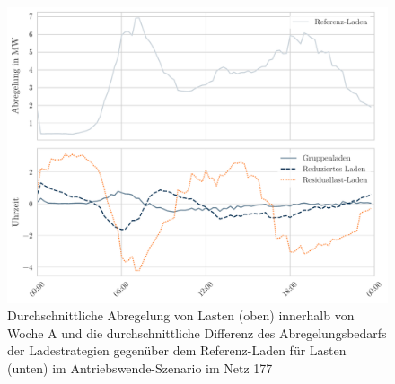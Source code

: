 \begin{figure}[H]
    \centering
    \includegraphics[width=\textwidth]{Bilder/177_load_diff}
    \caption{Durchschnittliche Abregelung von Lasten (oben) innerhalb von Woche A und die durchschnittliche Differenz des Abregelungsbedarfs der Ladestrategien gegenüber dem Referenz-Laden für Lasten (unten) im Antriebswende-Szenario im Netz \num{177}}\label{fig:177_load_diff}
\end{figure}